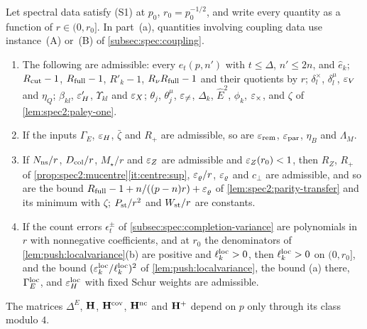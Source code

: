 \begin{lemma}\label{lem:spectral-monotone}
Let spectral data satisfy \textup{(S1)} at $p_0$, $r_0=p_0^{-1/2}$, and write every
quantity as a function of $r\in(0,r_0]$. In part~\textup{(a)}, quantities
involving coupling data use instance~\textup{(A)} or~\textup{(B)} of
\cref{subsec:spec:coupling}.
\begin{enumerate}[label=\textup{(\alph*)}]
\item The following are admissible: every $e_t(p,n')$ with $t\le\Delta$, $n'\le2n$,
  and $\hat e_k$; $R_{\mathrm{cut}}-1$, $R_{\rm full}-1$, $R'_k-1$, $R_\nu R_{\rm full}-1$ and their
  quotients by $r$; $\delta^\times_l$, $\delta^\mu_l$, $\varepsilon_V$ and $\eta_Q$; $\beta_{kl}$,
  $\varepsilon'_H$, $\Upsilon_{kl}$ and $\varepsilon_X$; $\theta_j$, $\theta^\mu_j$, $\varepsilon_{\ne}$, $\Delta_k$,
  $\hat E^2$, $\phi_k$, $\varepsilon_\times$, and $\zeta$ of \cref{lem:spec2:paley-one}.
\item If the inputs $\Gamma_E$, $\varepsilon_H$, $\bar\zeta$ and $R_+$ are admissible, so are
  $\varepsilon_{\rm rem}$, $\varepsilon_{\rm par}$, $\eta_B$ and $\Lambda_M$.
\item If $N_{\rm ns}/r$, $D_{\rm col}/r$, $M_\star/r$ and $\varepsilon_Z$ are admissible and
  $\varepsilon_Z(r_0)<1$, then $R_Z$, $R_+$ of \cref{prop:spec2:mucentre}\ref{it:centre:sup},
  $\varepsilon_\varrho/r$, $\varepsilon_\varrho$ and $c_\perp$ are admissible, and so are the bound
  $R_{\rm full}-1+n/((p-n)r)+\varepsilon_\varrho$ of \cref{lem:spec2:parity-transfer} and its
  minimum with $\zeta$; $P_{\rm st}/r^2$ and $W_{\rm st}/r$ are constants.
\item If the count errors $\epsilon^\pm_t$ of \cref{subsec:spec:completion-variance} are
  polynomials in $r$ with nonnegative coefficients, and at $r_0$ the denominators of
  \cref{lem:push:localvariance}\textup{(b)} are positive and $\ell^{\rm loc}_k>0$, then
  $\ell^{\rm loc}_k>0$ on $(0,r_0]$, and the bound $(\varepsilon^{\rm loc}_k/\ell^{\rm loc}_k)^2$ of
  \cref{lem:push:localvariance}, the bound (a) there, $\Gamma^{\rm loc}_E$, and
  $\varepsilon^{\rm loc}_H$ with fixed Schur weights are admissible.
\end{enumerate}
The matrices $\Delta^E$, $\mathbf H$, $\mathbf H^{\rm cov}$, $\mathbf H^{\rm nc}$ and $\mathbf H^+$ depend on $p$ only
through its class modulo $4$.
\end{lemma}

